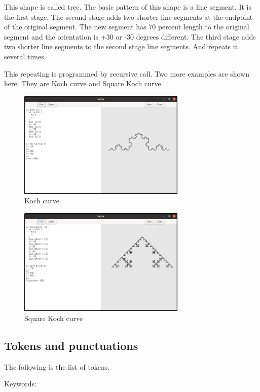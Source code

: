 This shape is called tree. The basic pattern of this shape is a line
segment. It is the first stage. The second stage adds two shorter line
segments at the endpoint of the original segment. The new segment has 70
percent length to the original segment and the orientation is +30 or -30
degrees different. The third stage adds two shorter line segments to the
second stage line segments. And repeats it several times.

This repeating is programmed by recursive call. Two more examples are
shown here. They are Koch curve and Square Koch curve.

\begin{figure}
\centering
\includegraphics[width=8cm,height=5.11cm]{../src/turtle/image/turtle_koch.png}
\caption{Koch curve}
\end{figure}

\begin{figure}
\centering
\includegraphics[width=8cm,height=5.11cm]{../src/turtle/image/turtle_square_koch.png}
\caption{Square Koch curve}
\end{figure}

\hypertarget{tokens-and-punctuations}{%
\subsection{Tokens and punctuations}\label{tokens-and-punctuations}}

The following is the list of tokens.

Keywords:


